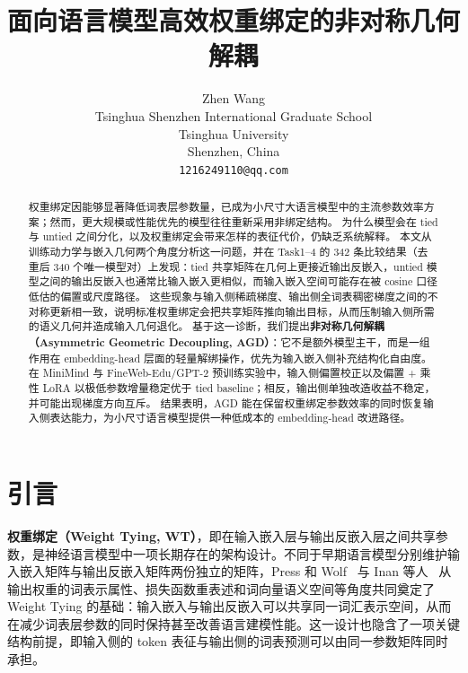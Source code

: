 \documentclass{article}
\title{面向语言模型高效权重绑定的非对称几何解耦}
\author{%
  Zhen Wang \\
  Tsinghua Shenzhen International Graduate School \\
  Tsinghua University \\
  Shenzhen, China \\
  \texttt{1216249110@qq.com} \\
}
\theoremstyle{plain}
\theoremstyle{definition}
\theoremstyle{remark}
\begin{document}
\maketitle

\begin{abstract}
  权重绑定因能够显著降低词表层参数量，已成为小尺寸大语言模型中的主流参数效率方案；然而，更大规模或性能优先的模型往往重新采用非绑定结构。
  为什么模型会在 tied 与 untied 之间分化，以及权重绑定会带来怎样的表征代价，仍缺乏系统解释。
  本文从训练动力学与嵌入几何两个角度分析这一问题，并在 Task1--4 的 342 条比较结果（去重后 340 个唯一模型对）上发现：tied 共享矩阵在几何上更接近输出反嵌入，untied 模型之间的输出反嵌入也通常比输入嵌入更相似，而输入嵌入空间可能存在被 cosine 口径低估的偏置或尺度路径。
  这些现象与输入侧稀疏梯度、输出侧全词表稠密梯度之间的不对称更新相一致，说明标准权重绑定会把共享矩阵推向输出目标，从而压制输入侧所需的语义几何并造成输入几何退化。
  基于这一诊断，我们提出\textbf{非对称几何解耦（Asymmetric Geometric Decoupling, AGD）}：它不是额外模型主干，而是一组作用在 embedding-head 层面的轻量解绑操作，优先为输入嵌入侧补充结构化自由度。
  在 MiniMind 与 FineWeb-Edu/GPT-2 预训练实验中，输入侧偏置校正以及偏置 + 乘性 LoRA 以极低参数增量稳定优于 tied baseline；相反，输出侧单独改造收益不稳定，并可能出现梯度方向互斥。
  结果表明，AGD 能在保留权重绑定参数效率的同时恢复输入侧表达能力，为小尺寸语言模型提供一种低成本的 embedding-head 改进路径。
\end{abstract}


\section{引言}
\label{sec:intro}

\textbf{权重绑定（Weight Tying, WT）}，即在输入嵌入层与输出反嵌入层之间共享参数，是神经语言模型中一项长期存在的架构设计。不同于早期语言模型分别维护输入嵌入矩阵与输出反嵌入矩阵两份独立的矩阵，Press 和 Wolf~\cite{press2017using} 与 Inan 等人~\cite{inan2017tying} 从输出权重的词表示属性、损失函数重表述和词向量语义空间等角度共同奠定了 Weight Tying 的基础：输入嵌入与输出反嵌入可以共享同一词汇表示空间，从而在减少词表层参数的同时保持甚至改善语言建模性能。这一设计也隐含了一项关键结构前提，即输入侧的 token 表征与输出侧的词表预测可以由同一参数矩阵同时承担。
\end{document}
